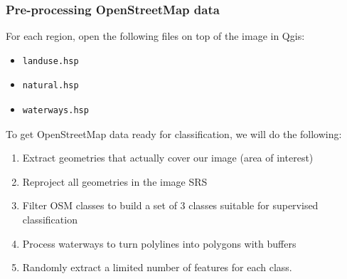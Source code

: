 \documentclass[8pt]{beamer}
\begin{document}
\begin{frame}[fragile]
\frametitle{Pre-processing OpenStreetMap data}

For each region, open the following files on top of the image in Qgis:
\begin{itemize}
\item \begin{verbatim}landuse.hsp\end{verbatim}
\item \begin{verbatim}natural.hsp\end{verbatim}
\item \begin{verbatim}waterways.hsp\end{verbatim}
\end{itemize}

To get OpenStreetMap data ready for classification, we will do the following:
\begin{enumerate}
\item Extract geometries that actually cover our image (area of interest)
\item Reproject all geometries in the image SRS
\item Filter OSM classes to build a set of 3 classes suitable for supervised classification
\item Process waterways to turn polylines into polygons with buffers
\item Randomly extract a limited number of features for each class.
\end{enumerate}
\end{frame}
\end{document}
